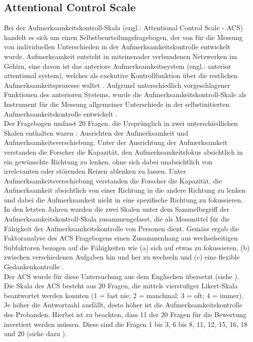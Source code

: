 \subsection{Attentional Control Scale} \label{subsection.acs}
Bei der Aufmerksamkeitskontroll-Skala (engl.: Attentional Control Scale - ACS) handelt es sich um einen Selbstbeurteilungsfragebogen, der von  für die Messung von individuellen Unterschieden in der Aufmerksamkeitskontrolle entwickelt wurde. Aufmerksamkeit entsteht in miteinenader verbundenen Netzwerken im Gehirn, eine davon ist das anteriore Aufmerksamkeitssystem (engl.: anterior attentional system), welches als exekutive Kontrollfunktion über die restlichen Aufmerksamkeitsprozesse waltet \cite{Posner1998}. Aufgrund unterschiedlich vorgeschlagener Funktionen des anterioren Systems, wurde die Aufmerksamkeitskontroll-Skale als Instrument für die Messung allgemeiner Unterschiede in der selbstinitierten Aufmerksamkeitskontrolle entwickelt \cite{Derryberry2001}.\\
Der Fragebogen umfasst 20 Fragen, die Ursprünglich in zwei unterschiedlichen Skalen enthalten waren \cite{Derryberry1988}: Ausrichten der Aufmerksamkeit und Aufmerksamkeitsverschiebung. Unter der Ausrichtung der Aufmerksamkeit verstanden die Forscher die Kapazität, den Aufmerksamkeitsfokus absichtlich in ein gewünschte Richtung zu lenken, ohne sich dabei unabsichtlich von irrelevanten oder störenden Reizen ablenken zu lassen. Unter Aufmerksamkeitsverschiebung verstanden die Forscher die Kapazität, die Aufmerksamkeit absichtlich von einer Richtung in die andere Richtung zu lenken und dabei die Aufmerksamkeit nicht in eine spezifische Richtung zu fokussieren. In den letzten Jahren wurden die zwei Skalen unter dem Sammelbegriff der Aufmerksamkeitskontroll-Skala zusammengefasst, die als Messmittel für die Fähigkeit der Aufmerksamkeitskontrolle von Personen dient. Gemäss  ergab die Faktoranalyse des ACS Fragebogens einen Zusammenhang aus wechselseitigen Subfaktoren bezogen auf die Fähigkeiten wie (a) sich auf etwas zu fokussieren, (b) zwischen verschiedenen Aufgaben hin und her zu wechseln und (c) eine flexible Gedankenkontrolle \cite[S.~226]{Derryberry2002}. \\
Der ACS wurde für diese Untersuchung aus dem Englischen übersetzt (siehe ). Die Skala des ACS besteht aus 20 Fragen, die mittels vierstufiger Likert-Skala beantwortet werden konnten (1 = fast nie; 2 = manchmal; 3 = oft; 4 = immer). Je höher die Antwortzahl ausfällt, desto höher ist die Aufmerksamkeitskontrolle des Probanden. Hierbei ist zu beachten, dass 11 der 20 Fragen für die Bewertung invertiert werden müssen. Diese sind die Fragen 1 bis 3, 6 bis 8, 11, 12, 15, 16, 18 und 20 (siehe dazu ).

